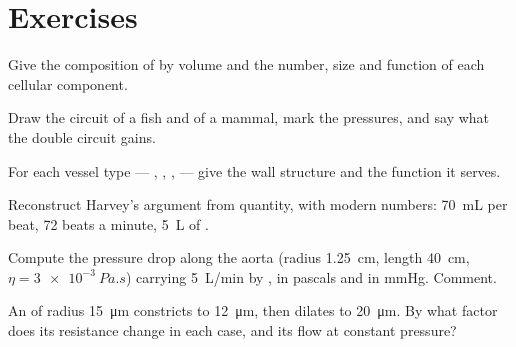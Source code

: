 \section{Exercises}

\begin{exercise}[$\star$]\label{exo:b2:blood-circulation:1}
Give the composition of  by volume and the number, size and
function of each cellular component.
\end{exercise}

\begin{exercise}[$\star$]\label{exo:b2:blood-circulation:2}
Draw the circuit of a fish and of a mammal, mark the pressures, and
say what the double circuit gains.
\end{exercise}

\begin{exercise}[$\star$]\label{exo:b2:blood-circulation:3}
For each vessel type --- , , ,  --- give
the wall structure and the function it serves.
\end{exercise}

\begin{exercise}[$\star$]\label{exo:b2:blood-circulation:4}
Reconstruct Harvey's argument from quantity, with modern numbers:
\qty{70}{mL} per beat, \num{72} beats a minute, \qty{5}{L} of .
\end{exercise}

\begin{exercise}[$\star\star$]\label{exo:b2:blood-circulation:5}
Compute the pressure drop along the aorta (radius \qty{1.25}{cm},
length \qty{40}{cm}, $\eta = \qty{3e-3}{Pa.s}$) carrying
\qty{5}{L/min} by , in pascals and in mmHg. Comment.
\end{exercise}

\begin{exercise}[$\star\star$]\label{exo:b2:blood-circulation:6}
An  of radius \qty{15}{\micro m} constricts to
\qty{12}{\micro m}, then dilates to \qty{20}{\micro m}. By what
factor does its resistance change in each case, and its flow at
constant pressure?
\end{exercise}

